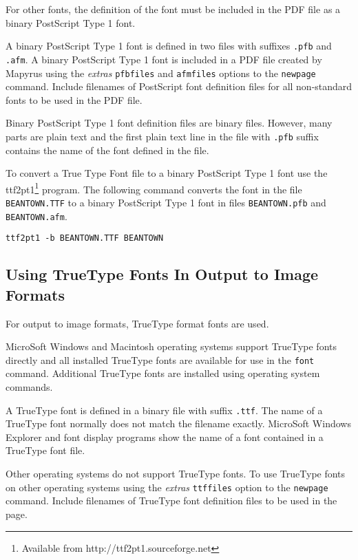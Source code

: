 For other fonts, the definition of the font must be included
in the PDF file as a binary PostScript Type 1 font.

A binary PostScript Type 1 font is defined in two files with suffixes
\texttt{.pfb} and \texttt{.afm}.  A binary PostScript Type 1
font is included in a PDF file created
by Mapyrus using the
\textit{extras} \texttt{pfbfiles} and \texttt{afmfiles}
options to the \texttt{newpage} command.
Include filenames of PostScript font definition files for all
non-standard fonts to be used in the PDF file.

Binary PostScript Type 1 font definition files are binary files.
However, many parts are plain text and the first plain text
line in the file with \texttt{.pfb} suffix contains the name
of the font defined in the file.

To convert a True Type Font file to a binary  PostScript Type 1 font use the
ttf2pt1\footnote{Available from http://ttf2pt1.sourceforge.net} program.  The
following command converts the font in the file \texttt{BEANTOWN.TTF} to a
binary PostScript Type 1 font in files
\texttt{BEANTOWN.pfb} and
\texttt{BEANTOWN.afm}.

\begin{verbatim}
ttf2pt1 -b BEANTOWN.TTF BEANTOWN
\end{verbatim}

\subsection{Using TrueType Fonts In Output to Image Formats}
\label{ttffonts}

For output to image formats, TrueType format fonts are used.

MicroSoft Windows and Macintosh operating systems support TrueType
fonts directly and all installed TrueType fonts are available
for use in the \texttt{font} command.
Additional TrueType fonts are installed using operating system commands.

A TrueType font is defined in a binary file with suffix
\texttt{.ttf}.
The name of a TrueType font normally does not match the filename exactly.
MicroSoft Windows Explorer and font display programs show the name of
a font contained in a TrueType font file.

Other operating systems do not support TrueType fonts.  To use TrueType fonts
on other operating systems using the \textit{extras} \texttt{ttffiles} option
to the \texttt{newpage} command.  Include filenames of TrueType font definition
files to be used in the page.

